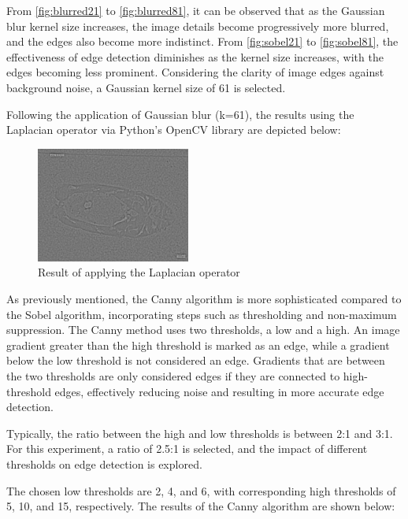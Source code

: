 From \autoref{fig:blurred21} to \autoref{fig:blurred81}, it can be observed that as the Gaussian blur kernel size increases, the image details become progressively more blurred, and the edges also become more indistinct. From \autoref{fig:sobel21} to \autoref{fig:sobel81}, the effectiveness of edge detection diminishes as the kernel size increases, with the edges becoming less prominent. Considering the clarity of image edges against background noise, a Gaussian kernel size of 61 is selected.


Following the application of Gaussian blur (k=61), the results using the Laplacian operator via Python's OpenCV library are depicted below:

\begin{figure}[H]
\centering
\includegraphics[width=0.45\textwidth]{./fig/gausssian/laplacian61.jpg}
\caption{Result of applying the Laplacian operator}
\label{fig:laplacian}
\end{figure}

As previously mentioned, the Canny algorithm is more sophisticated compared to the Sobel algorithm, incorporating steps such as thresholding and non-maximum suppression. The Canny method uses two thresholds, a low and a high. An image gradient greater than the high threshold is marked as an edge, while a gradient below the low threshold is not considered an edge. Gradients that are between the two thresholds are only considered edges if they are connected to high-threshold edges, effectively reducing noise and resulting in more accurate edge detection.

Typically, the ratio between the high and low thresholds is between 2:1 and 3:1. For this experiment, a ratio of 2.5:1 is selected, and the impact of different thresholds on edge detection is explored.

The chosen low thresholds are 2, 4, and 6, with corresponding high thresholds of 5, 10, and 15, respectively. The results of the Canny algorithm are shown below:

